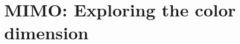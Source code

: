 \chapter{MIMO: Exploring the color dimension}
\label{chapter:mimoColor}
\thispagestyle{myheadings}





